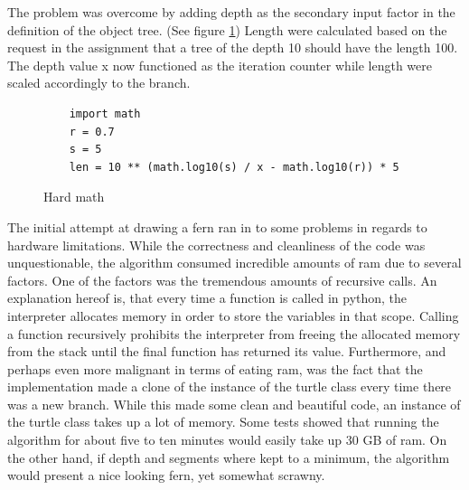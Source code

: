 \documentclass[titlepage]{article}
\begin{document}
The problem was overcome by adding depth as the secondary input factor in the definition of the object tree. (See figure \ref{fig:hardmath})  Length were calculated based on the request in the assignment that a tree of the depth 10 should have the length 100. The depth value x now functioned as the iteration counter while length were scaled accordingly to the branch.\par

\begin{figure}[H]
  \begin{verbatim}
    import math
    r = 0.7
    s = 5
    len = 10 ** (math.log10(s) / x - math.log10(r)) * 5
  \end{verbatim}
  \caption{Hard math}
  \label{fig:hardmath}
\end{figure}

The initial attempt at drawing a fern ran in to some problems in regards to hardware limitations. While the correctness and cleanliness of the code was unquestionable, the algorithm consumed incredible amounts of ram due to several factors. One of the factors was the tremendous amounts of recursive calls. An explanation hereof is, that every time a function is called in python, the interpreter allocates memory in order to store the variables in that scope. Calling a function recursively prohibits the interpreter from freeing the allocated memory from the stack until the final function has returned its value. Furthermore, and perhaps even more malignant in terms of eating ram, was the fact that the implementation made a clone of the instance of the turtle class every time there was a new branch. While this made some clean and beautiful code, an instance of the turtle class takes up a lot of memory. Some tests showed that running the algorithm for about five to ten minutes would easily take up 30 GB of ram. On the other hand, if depth and segments where kept to a minimum, the algorithm would present a nice looking fern, yet somewhat scrawny.
\end{document}
